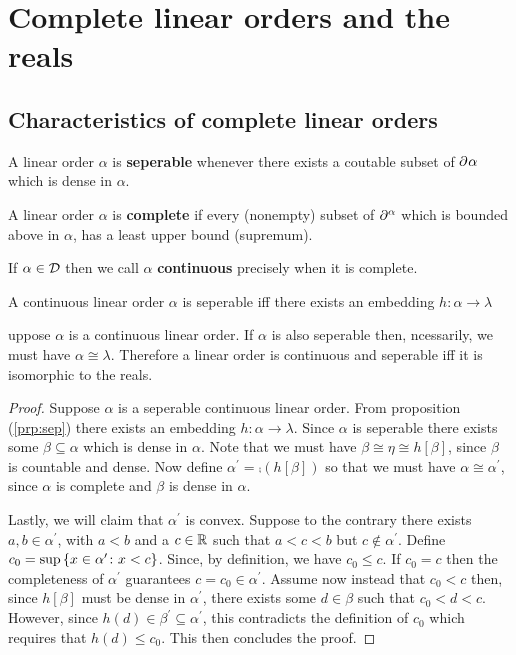 \chapter{Complete linear orders and the reals}

	\section{Characteristics of complete linear orders}

	\begin{dfn}[Separable]
		A linear order $\alpha$ is \textbf{seperable} whenever there exists a coutable subset of $\partial^{}\alpha$ which is dense in $\alpha$.
	\end{dfn}

	\begin{dfn}[Completeness]
		A linear order $\alpha$ is \textbf{complete} if every (nonempty) subset of $\partial^{\alpha}$ which is bounded above in $\alpha$, has a least upper bound (supremum).
	\end{dfn}

	\begin{dfn}
		If $\alpha\in\mathcal{D}$ then we call $\alpha$ \textbf{continuous} precisely when it is complete.
	\end{dfn}

	\begin{prp}[Seperability]\label{prp:sep}
		A continuous linear order $\alpha$ is seperable iff there exists an embedding $h\colon\alpha\to\lambda$
	\end{prp}

	\begin{thm}
		uppose $\alpha$ is a continuous linear order.  If $\alpha$ is also seperable then, ncessarily, we must have $\alpha\cong\lambda$.  Therefore a linear order is continuous and seperable iff it is isomorphic to the reals.
	\end{thm}
	\begin{proof}
		Suppose $\alpha$ is a seperable continuous linear order.  From proposition (\ref{prp:sep}) there exists an embedding $h\colon\alpha\to\lambda$.  Since $\alpha$ is seperable there exists some $\beta\subseteq\alpha$ which is dense in $\alpha$.  Note that we must have $\beta\cong\eta\cong h[\beta]$, since $\beta$ is countable and dense.  Now define $\alpha^\prime=\comp(h[\beta])$ so that we must have $\alpha\cong\alpha^\prime$, since $\alpha$ is complete and $\beta$ is dense in $\alpha$.

		Lastly, we will claim that $\alpha^\prime$ is convex.  Suppose to the contrary there exists $a,b\in\alpha^\prime$, with $a<b$ and a $c\in\mathbb{R}$ such that $a<c<b$ but $c\notin\alpha^\prime$.  Define $c_0=\sup\left\lbrace x\in\alpha^\prime\colon x<c \right\rbrace$. Since, by definition, we have $c_0\leq c$.  If $c_0=c$ then the completeness of $\alpha^\prime$ guarantees $c=c_0\in\alpha^\prime$.  Assume now instead that $c_0<c$ then, since $h[\beta]$ must be dense in $\alpha^\prime$, there exists some $d\in\beta$ such that $c_0<d<c$.  However, since $h(d)\in\beta^\prime\subseteq\alpha^\prime$, this contradicts the definition of $c_0$ which requires that $h(d)\leq c_0$.  This then concludes the proof.
	\end{proof}

